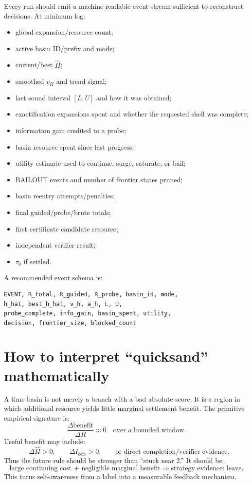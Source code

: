 \documentclass[11pt]{article}
\begin{document}
Every run should emit a machine-readable event stream sufficient to reconstruct decisions. At minimum log:
\begin{itemize}
\item global expansion/resource count;
\item active basin ID/prefix and mode;
\item current/best $\widehat H$;
\item smoothed $v_H$ and trend signal;
\item last sound interval $[L,U]$ and how it was obtained;
\item exactification expansions spent and whether the requested shell was complete;
\item information gain credited to a probe;
\item basin resource spent since last progress;
\item utility estimate used to continue, surge, saturate, or bail;
\item BAILOUT events and number of frontier states pruned;
\item basin reentry attempts/penalties;
\item final guided/probe/brute totals;
\item first certificate candidate resource;
\item independent verifier result;
\item $\tau_0$ if settled.
\end{itemize}

A recommended event schema is:
\begin{lstlisting}
EVENT, R_total, R_guided, R_probe, basin_id, mode,
h_hat, best_h_hat, v_h, a_h, L, U,
probe_complete, info_gain, basin_spent, utility,
decision, frontier_size, blocked_count
\end{lstlisting}

\section{How to interpret ``quicksand'' mathematically}

A time basin is not merely a branch with a bad absolute score. It is a region in which additional resource yields little marginal settlement benefit. The primitive empirical signature is:
\[
\frac{\Delta\text{benefit}}{\Delta R}\approx0
\quad\text{over a bounded window.}
\]
Useful benefit may include:
\[
-\Delta\widehat H>0,\qquad
\Delta I_{\mathrm{cert}}>0,\qquad
\text{or direct completion/verifier evidence}.
\]
Thus the future rule should be stronger than ``stuck near 2.'' It should be:
\[
\boxed{\text{large continuing cost + negligible marginal benefit} \Rightarrow \text{strategy evidence: leave}.}
\]
This turns self-awareness from a label into a measurable feedback mechanism.
\end{document}
